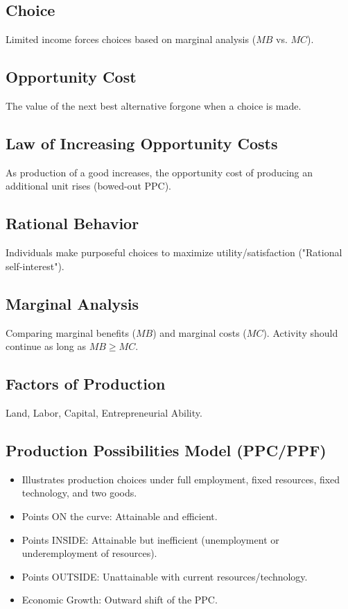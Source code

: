 \documentclass{article}
\begin{document}
\subsection*{Choice}
Limited income forces choices based on marginal analysis ($MB$ vs. $MC$).

\subsection*{Opportunity Cost}
The value of the next best alternative forgone when a choice is made.

\subsection*{Law of Increasing Opportunity Costs}
As production of a good increases, the opportunity cost of producing an additional unit rises (bowed-out PPC).

\subsection*{Rational Behavior}
Individuals make purposeful choices to maximize utility/satisfaction ("Rational self-interest").

\subsection*{Marginal Analysis}
Comparing marginal benefits ($MB$) and marginal costs ($MC$). Activity should continue as long as $MB \geq MC$.

\subsection*{Factors of Production}
Land, Labor, Capital, Entrepreneurial Ability.

\subsection*{Production Possibilities Model (PPC/PPF)}
\begin{itemize}
    \item Illustrates production choices under full employment, fixed resources, fixed technology, and two goods.
    \item Points ON the curve: Attainable and efficient.
    \item Points INSIDE: Attainable but inefficient (unemployment or underemployment of resources).
    \item Points OUTSIDE: Unattainable with current resources/technology.
    \item Economic Growth: Outward shift of the PPC.
\end{itemize}
\end{document}

